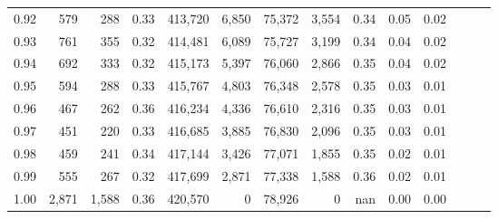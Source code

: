 \begin{tabular}{rrrrrrrrrrrrrr}
0.92 &    579 &    288 &  0.33 &  413,720 &    6,850 &  75,372 &   3,554 &  0.34 &  0.05 &      0.02 \\
0.93 &    761 &    355 &  0.32 &  414,481 &    6,089 &  75,727 &   3,199 &  0.34 &  0.04 &      0.02 \\
0.94 &    692 &    333 &  0.32 &  415,173 &    5,397 &  76,060 &   2,866 &  0.35 &  0.04 &      0.02 \\
0.95 &    594 &    288 &  0.33 &  415,767 &    4,803 &  76,348 &   2,578 &  0.35 &  0.03 &      0.01 \\
0.96 &    467 &    262 &  0.36 &  416,234 &    4,336 &  76,610 &   2,316 &  0.35 &  0.03 &      0.01 \\
0.97 &    451 &    220 &  0.33 &  416,685 &    3,885 &  76,830 &   2,096 &  0.35 &  0.03 &      0.01 \\
0.98 &    459 &    241 &  0.34 &  417,144 &    3,426 &  77,071 &   1,855 &  0.35 &  0.02 &      0.01 \\
0.99 &    555 &    267 &  0.32 &  417,699 &    2,871 &  77,338 &   1,588 &  0.36 &  0.02 &      0.01 \\
1.00 &  2,871 &  1,588 &  0.36 &  420,570 &        0 &  78,926 &       0 &   nan &  0.00 &      0.00 \\
\bottomrule
\end{tabular}
